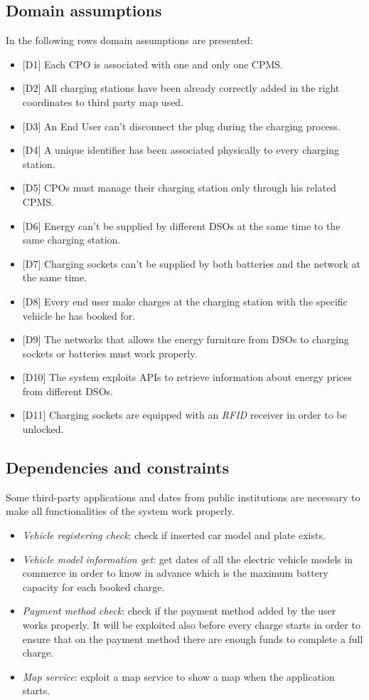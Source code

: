 \documentclass[a4paper]{report}
\begin{document}
\subsection{Domain assumptions}

In the following rows domain assumptions are presented:
\begin{itemize}
\item{[D1]} \label{D1} Each CPO is associated with one and only one CPMS.
\item{[D2]} \label{D2} All charging stations have been already correctly added in the right coordinates to third party map used.
\item{[D3]} \label{D3} An End User can't disconnect the plug during the charging process.
\item{[D4]} \label{D4} A unique identifier has been associated physically to every charging station.
\item{[D5]} \label{D5} CPOs must manage their charging station only through his related CPMS.
\item{[D6]} \label{D6} Energy can't be supplied by different DSOs at the same time to the same charging station.
\item{[D7]} \label{D7} Charging sockets can't be supplied by both batteries and the network at the same time.
\item{[D8]} \label{D8} Every end user make charges at the charging station with the specific vehicle he has booked for.
\item{[D9]} \label{D9} The networks that allows the energy furniture from DSOs to charging sockets or batteries must work properly.
\item{[D10]} \label{D10} The system exploits APIs to retrieve information about energy prices from different DSOs.
\item{[D11]} \label{D11} Charging sockets are equipped with an \textit{RFID} receiver in order to be unlocked.
\end{itemize}
\subsection{Dependencies and constraints}
Some third-party applications and dates from public institutions are necessary to make all functionalities of the system work properly.
\begin{itemize}
    \item \textit{Vehicle registering check}: check if inserted car model and plate exists.
    \item \textit{Vehicle model information get}: get dates of all the electric vehicle models in commerce in order to know in advance which is the maximum battery capacity for each booked charge.
    \item \textit{Payment method check}: check if the payment method added by the user works properly. It will be exploited also before every charge starts in order to ensure that on the payment method there are enough funds to complete a full charge.
    \item \textit{Map service}: exploit a map service to show a map when the application starts.
\end{itemize}
\end{document}
